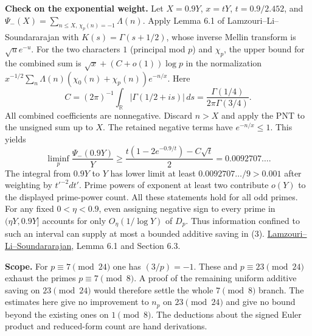 \documentclass[11pt]{article}
\newcommand{\ch}{\chi_p}
\newcommand{\lls}{\href{https://arxiv.org/pdf/1309.3595}{Lamzouri--Li--Soundararajan}}
\begin{document}
\textbf{Check on the exponential weight.} Let $X=0.9Y$, $x=tY$, $t=0.9/2.452$,
and $\Psi_-(X)=\sum_{n\le X,\,\ch(n)=-1}\Lambda(n)$. Apply Lemma 6.1 of Lamzouri--Li--Soundararajan with $K(s)=\Gamma(s+1/2)$, whose inverse Mellin transform is $\sqrt u e^{-u}$. For the two characters $1$ (principal mod $p$) and $\ch$, the upper bound for the combined sum is $\sqrt x+(C+o(1))\log p$ in the normalization $x^{-1/2}\sum_n\Lambda(n)(\chi_0(n)+\ch(n))e^{-n/x}$. Here
\[
 C=(2\pi)^{-1}\int_{\mathbb R}|\Gamma(1/2+is)|\,ds
   =\frac{\Gamma(1/4)}{2\pi\Gamma(3/4)}.
\]
All combined coefficients are nonnegative. Discard $n>X$ and apply the PNT to the unsigned sum up to $X$. The retained negative terms have $e^{-n/x}\le1$. This yields
\[
 \liminf_p\frac{\Psi_-(0.9Y)}{Y}\ge
 \frac{t(1-2e^{-0.9/t})-C\sqrt t}{2}
 =0.0092707\ldots .
\]
The integral from $0.9Y$ to $Y$ has lower limit at least $0.0092707\ldots/9>0.001$ after weighting by $t'^{-2}dt'$. Prime powers of exponent at least two contribute $o(Y)$ to the displayed prime-power count. All these statements hold for all odd primes. For any fixed $0<\eta<0.9$, even assigning negative sign to every prime in $(\eta Y,0.9Y]$ accounts for only $O_\eta(1/\log Y)$ of $D_p$. Thus information confined to such an interval can supply at most a bounded additive saving in (3). \lls, Lemma 6.1 and Section 6.3.

\textbf{Scope.} For $p\equiv7\pmod{24}$ one has $(3/p)=-1$. These and $p\equiv23\pmod{24}$ exhaust the primes $p\equiv7\pmod8$. A proof of the remaining uniform additive saving on $23\pmod{24}$ would therefore settle the whole $7\pmod8$ branch. The estimates here give no improvement to $n_p$ on $23\pmod{24}$ and give no bound beyond the existing ones on $1\pmod8$. The deductions about the signed Euler product and reduced-form count are hand derivations.
\end{document}
